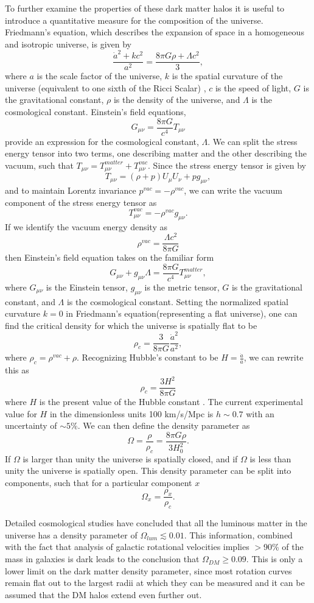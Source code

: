 \documentclass[a4paper,12pt]{article}
\begin{document}
To further examine the properties of these dark matter halos it is useful to introduce a quantitative measure for the composition of the universe.  Friedmann's equation, which describes the expansion of space in a homogeneous and isotropic universe, is given by
\[\frac{\dot{a}^2 + kc^2}{a^2} = \frac{8 \pi G \rho + \Lambda c^2}{3},\]
where $a$ is the scale factor of the universe, $k$ is the spatial curvature of the universe (equivalent to one sixth of the Ricci Scalar) , $c$ is the speed of light, $G$ is the gravitational constant, $\rho$ is the density of the universe, and $\Lambda$ is the cosmological constant. Einstein's field equations,
\[G_{\mu\nu} = \frac{8 \pi G}{c^4} T_{\mu\nu}\]
provide an expression for the cosmological constant, $\Lambda$.  We can split the stress energy tensor into two terms, one describing matter and the other describing the vacuum, such that $T_{\mu\nu}=T_{\mu\nu}^{matter}+T_{\mu\nu}^{vac}$.  Since the stress energy tensor is given by
\[T_{\mu\nu} = (\rho + p)U_{\mu}U_{\nu} + pg_{\mu\nu},\] 
and to maintain Lorentz invariance $p^{vac} = -\rho^{vac}$, we can write the vacuum component of the stress energy tensor as
\[T_{\mu\nu}^{vac}=-\rho^{vac} g_{\mu\nu}.\]
If we identify the vacuum energy density as
\[\rho^{vac}=\frac{\Lambda c^2}{8\pi G}\]
then Einstein's field equation takes on the familiar form
\[G_{\mu\nu} + g_{\mu\nu}\Lambda= \frac{8 \pi G}{c^4} T_{\mu\nu}^{matter},\]
where $G_{\mu\nu}$ is the Einstein tensor, $g_{\mu\nu}$ is the metric tensor, $G$ is the gravitational constant, and $\Lambda$ is the cosmological constant.
Setting the normalized spatial curvature $k = 0$ in Friedmann's equation(representing a flat universe), one can find the critical density for which the universe is spatially flat to be
\[\rho_c = \frac{3}{8 \pi G}\frac{\dot{a}^2}{a^2},\]
where $\rho_c = \rho^{vac}+\rho$.
Recognizing Hubble's constant to be $ H = \frac { \dot{a}}{a} $, we can rewrite this as
\[\rho_c =\frac{3H^2}{8 \pi G} \]
where $H$ is the present value of the Hubble constant \cite{Javorsek}. The current experimental value for $H$ in the dimensionless units 100 km/s/Mpc is $ h \sim 0.7 $ with an uncertainty of $\sim5\%$.  We can then define the density parameter as 
\[\Omega=\frac{\rho}{\rho_c}=\frac{8 \pi G \rho}{3 H_0^2}.\]
If $\Omega$ is larger than unity the universe is spatially closed, and if $\Omega$ is less than unity the universe is spatially open. This density parameter can be split into components, such that for a particular component $x$
\[\Omega_x = \frac{\rho_x}{\rho_c}.\]

Detailed cosmological studies have concluded that all the luminous matter in the universe has a density parameter of $\Omega_{lum} \lesssim 0.01$.  This information, combined  with the fact that analysis of galactic rotational velocities implies $> $90\% of the mass in galaxies is dark leads to the conclusion that $\Omega_{DM} \geq 0.09$.  This is only a lower limit on the dark matter density parameter, since most rotation curves remain flat out to the largest radii at which they can be measured and it can be assumed that the DM halos extend even further out.
\end{document}
